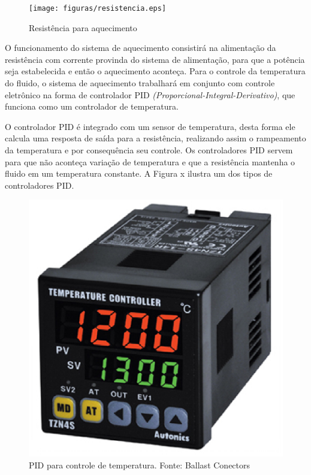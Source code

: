 \begin{figure}[h]
	\centering
	\texttt{[image: figuras/resistencia.eps]}
	\caption{Resistência para aquecimento}
	\label{resistencia}
\end{figure}

O funcionamento do sistema de aquecimento consistirá na alimentação da resistência com corrente provinda do sistema de alimentação, para que a potência seja estabelecida e então o aquecimento aconteça. Para o controle da temperatura do fluido, o sistema de aquecimento trabalhará em conjunto com controle eletrônico na forma de controlador PID \textit{(Proporcional-Integral-Derivativo)}, que funciona como um controlador de temperatura.

 O controlador PID é integrado com um sensor de temperatura, desta forma ele calcula uma resposta de saída para a resistência, realizando assim o rampeamento da temperatura e por consequência seu controle. Os controladores PID servem para que não aconteça variação de temperatura e que a resistência mantenha o fluido em um temperatura constante. A Figura x ilustra um dos tipos de controladores PID.

 \begin{figure}[h]
 	\centering
 	\includegraphics[keepaspectratio=true,scale=0.3]{figuras/pid.eps}
 	\caption{PID para controle de temperatura. Fonte: Ballast Conectors}
 	\label{pid}
 \end{figure}

